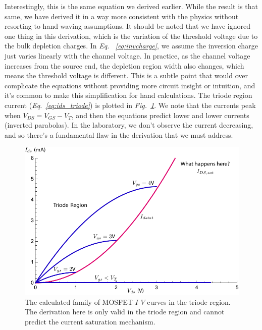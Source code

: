 Interestingly, this is the same equation we derived earlier.  While the result is that same, we have derived it in a way more consistent with the physics without resorting to hand-waving assumptions.  It should be noted that we have ignored one thing in this derivation, which is the variation of the threshold voltage due to the bulk depletion charges.  In \emph{Eq. ~\ref{eq:invcharge}}, we assume the inversion charge just varies linearly with the channel voltage. In practice, as the channel voltage increases from the source end, the depletion region width also changes, which means the threshold voltage is different. This is a subtle point that would over complicate the equations without providing more circuit insight or intuition, and it's common to make this simplification for hand calculations.
The triode region current (\emph{Eq.~\ref{eq:ids_triode}}) is plotted in \emph{Fig.~\ref{fig:ids_triode_only}}.  We note that the currents peak when $V_{DS} = V_{GS} - V_T$, and then the equations predict lower and lower currents (inverted parabolas).  In the laboratory, we don't observe the current decreasing, and so there's a fundamental flaw in the derivation that we must address.  
\begin{figure}[tb]
\centering
\includegraphics[width=.75\columnwidth]{ids_triode_only} 
\caption{The calculated family of MOSFET $I$-$V$ curves in the triode region.  The derivation here is only valid in the triode region and cannot predict the current saturation mechanism.}
\label{fig:ids_triode_only}
\end{figure}
